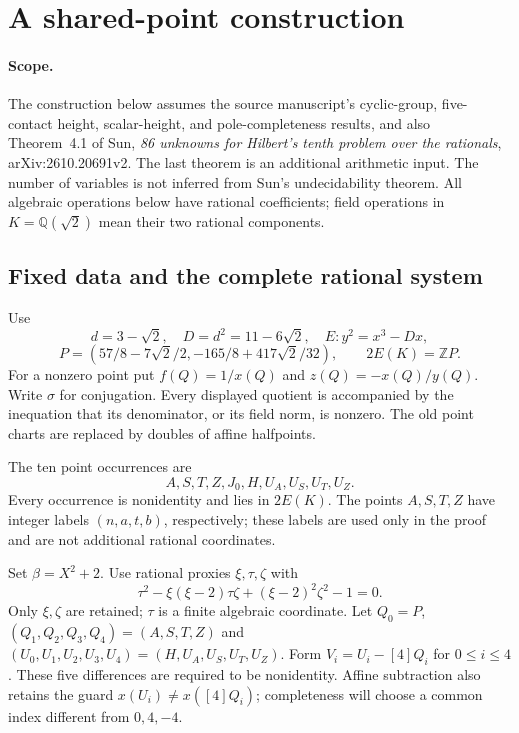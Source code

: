 \section{A shared-point construction}
\label{sec:new-shared-source}

\paragraph{Scope.}
The construction below assumes the source manuscript's cyclic-group,
five-contact height, scalar-height, and pole-completeness results, and also
Theorem~4.1 of Sun, \emph{86 unknowns for Hilbert's tenth problem over the
rationals}, arXiv:2610.20691v2. The last theorem is an additional arithmetic
input. The number of variables is not inferred from Sun's undecidability
theorem. All algebraic operations below have rational coefficients; field
operations in $K=\mathbb Q(\sqrt2)$ mean their two rational components.

\subsection{Fixed data and the complete rational system}
Use
\[
 d=3-\sqrt2,\quad D=d^2=11-6\sqrt2,\quad
 E:y^2=x^3-Dx,
\]
\[
 P=(57/8-7\sqrt2/2,-165/8+417\sqrt2/32),\qquad
 2E(K)=\mathbb ZP.
\]
For a nonzero point put $f(Q)=1/x(Q)$ and $z(Q)=-x(Q)/y(Q)$.
Write $\sigma$ for conjugation. Every displayed quotient is accompanied
by the inequation that its denominator, or its field norm, is nonzero.
The old point charts are replaced by doubles of affine halfpoints.

The ten point occurrences are
\[
 A,S,T,Z,J_0,H,U_A,U_S,U_T,U_Z.
\]
Every occurrence is nonidentity and lies in $2E(K)$. The points $A,S,T,Z$
have integer labels $(n,a,t,b)$, respectively; these labels are used only
in the proof and are not additional rational coordinates.

Set $\beta=X^2+2$. Use rational proxies $\xi,\tau,\zeta$ with
\[
 \tau^2-\xi(\xi-2)\tau\zeta+(\xi-2)^2\zeta^2-1=0.
\]
Only $\xi,\zeta$ are retained; $\tau$ is a finite algebraic coordinate.
Let $Q_0=P$, $(Q_1,Q_2,Q_3,Q_4)=(A,S,T,Z)$ and
$(U_0,U_1,U_2,U_3,U_4)=(H,U_A,U_S,U_T,U_Z)$.
Form $V_i=U_i-[4]Q_i$ for $0\le i\le4$. These five differences are
required to be nonidentity. Affine subtraction also retains the guard
$x(U_i)\ne x([4]Q_i)$; completeness will choose a common index different
from $0,4,-4$.

